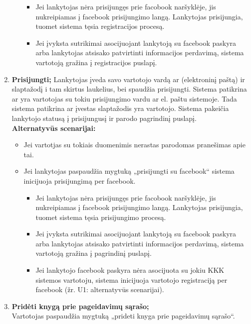 \documentclass{VUMIFPSkursinis}
\begin{document}
\begin{enumerate}[label=\textbf{U\arabic*.}]
\begin{itemize}
						\begin{itemize}
							\item Jei lankytojas nėra prisijungęs prie facobook naršyklėje, jis nukreipiamas į facebook prisijungimo langą. 
								Lankytojas prisijungia, tuomet sistema tęsia registracijos procesą.
							\item Jei įvyksta sutrikimai asocijuojant lankytoją su facebook paskyra arba lankytojas atsisako patvirtinti informacijos perdavimą,
								sistema vartotoją gražina į registracijos puslapį.
						\end{itemize}
				\end{itemize}
			\item \textbf{Prisijungti;}
				Lankytojas įveda savo vartotojo vardą ar (elektroninį paštą) ir slaptažodį i tam skirtus laukelius, bei spaudžia prisijungti.
				Sistema patikrina ar yra vartotojas su tokiu prisijungimo vardu ar el. paštu sistemoje. 
				Tada sistema patikrina ar įvestas slaptažodis yra vartotojo. Sistema pakeičia lankytojo statusą į prisijungusį ir parodo pagrindinį puslapį.\\
				\textbf{Alternatyvūs scenarijai:}
				\begin{itemize}
					\item Jei vartotjas su tokiais duomenimis nerastas parodomas pranešimas apie tai.
					\item Jei lankytojas paspaudžia mygtuką „prisijungti su facebook“ sistema inicijuoja prisijungimą per facebook.
						\begin{itemize}
							\item Jei lankytojas nėra prisijungęs prie facobook naršyklėje, jis nukreipiamas į facebook prisijungimo langą. 
								Lankytojas prisijungia, tuomet sistema tęsia prisijungimo procesą.
							\item Jei įvyksta sutrikimai asocijuojant lankytoją su facebook paskyra arba lankytojas atsisako patvirtinti informacijos perdavimą,
								sistema vartotoją gražina į pagrindinį puslapį.
							\item Jei lankytojo facebook paskyra nėra asocijuota su jokiu KKK sistemos vartotoju, sistema inicijuoja vartotojo registraciją per facebook (žr. U1: alternatyvūs scenarijai).
						\end{itemize}
				\end{itemize}
			\item \textbf{Pridėti knygą prie pageidavimų sąrašo;} \\
				Vartotojas paspaudžia mygtuką „prideti knyga prie pageidavimų sąrašo“. 

\end{enumerate}
\end{document}
